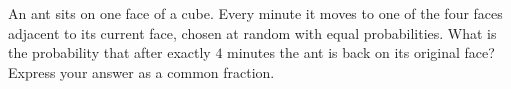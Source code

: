 An ant sits on one face of a cube. Every minute it moves to one of the four faces adjacent to its current face, chosen at random with equal probabilities. What is the probability that after exactly $4$ minutes the ant is back on its original face? Express your answer as a common fraction.
